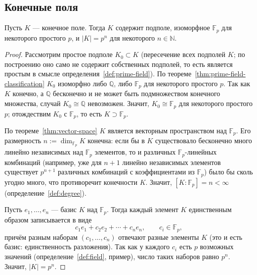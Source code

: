 \documentclass[12pt]{article}
\begin{document}
    \subsection{Конечные поля}
    
    \begin{theorem}\label{thm:finite-field-size}
    	Пусть $K$ --- конечное поле. Тогда $K$ содержит подполе, изоморфное $\mathbb{F}_p$ для некоторого простого $p$, и $|K| = p^n$ для некоторого $n \in \mathbb{N}$.
    \end{theorem}
    \begin{proof}
    	Рассмотрим простое подполе $K_0 \subset K$ (пересечение всех подполей $K$; по построению оно само не содержит собственных подполей, то есть является простым в смысле определения~\ref{def:prime-field}). По теореме~\ref{thm:prime-field-classification} $K_0$ изоморфно либо $\mathbb{Q}$, либо $\mathbb{F}_p$ для некоторого простого $p$. Так как $K$ конечно, а $\mathbb{Q}$ бесконечно и не может быть подмножеством конечного множества, случай $K_0 \cong \mathbb{Q}$ невозможен. Значит, $K_0 \cong \mathbb{F}_p$ для некоторого простого $p$; отождествим $K_0$ с $\mathbb{F}_p$, то есть $K \supset \mathbb{F}_p$.
    
    	По теореме~\ref{thm:vector-space} $K$ является векторным пространством над $\mathbb{F}_p$. Его размерность $n := \dim_{\mathbb{F}_p} K$ конечна: если бы в $K$ существовало бесконечно много линейно независимых над $\mathbb{F}_p$ элементов, то и различных $\mathbb{F}_p$-линейных комбинаций (например, уже для $n+1$ линейно независимых элементов существует $p^{n+1}$ различных комбинаций с коэффициентами из $\mathbb{F}_p$) было бы сколь угодно много, что противоречит конечности $K$. Значит, $[K:\mathbb{F}_p] = n < \infty$ (определение~\ref{def:degree}).
    
    	Пусть $e_1,\ldots,e_n$ --- базис $K$ над $\mathbb{F}_p$. Тогда каждый элемент $K$ единственным образом записывается в виде
    	\[
    	c_1 e_1 + c_2 e_2 + \cdots + c_n e_n, \qquad c_i \in \mathbb{F}_p,
    	\]
    	причём разным наборам $(c_1,\ldots,c_n)$ отвечают разные элементы $K$ (это и есть базис: единственность разложения). Так как у каждого $c_i$ есть $p$ возможных значений (определение~\ref{def:field}, пример), число таких наборов равно $p^n$. Значит, $|K| = p^n$.
    \end{proof}
    
\end{document}
